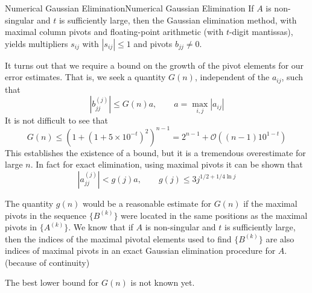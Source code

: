 \documentclass[../main.tex]{subfiles}
\begin{document}
\begin{lemma}{Numerical Gaussian Elimination}{Numerical Gaussian Elimination}
	If $A$ is non-singular and $t$ is sufficiently large, then the Gaussian elimination method, with maximal column pivots and floating-point arithmetic (with $t$-digit mantissas), yields multipliers $s_{ij}$ with $|s_{ij}| \leq 1$ and pivots $b_{jj} \neq 0$.
\end{lemma}

It turns out that we require a bound on the growth of the pivot elements for our error estimates. That is, we seek a quantity $G(n)$, independent of the $a_{ij}$, such that
\begin{equation} \label{eq:bound-for-pivots}
	| b_{jj}^{(j)} | \leq G(n) a, \qquad a = \max_{i,j} | a_{ij} |
\end{equation}
It is not difficult to see that
\begin{equation} \label{eq:bound-for-G}
	G(n) \leq (1 + (1 + 5 \times 10^{-t})^2)^{n-1} = 2^{n-1} + \mathcal{O}((n-1) 10^{1-t})
\end{equation}
This establishes the existence of a bound, but it is a tremendous overestimate for large $n$. In fact for exact elimination, using maximal pivots it can be shown that
\begin{equation}
	| a_{jj}^{(j)} | < g(j) a, \qquad g(j) \leq 3 j^{1/2 + 1/4 \ln j}
\end{equation}

The quantity $g(n)$ would be a reasonable estimate for $G(n)$ if the maximal pivots in the sequence $\{ B^{(k)} \}$ were located in the same positions as the maximal pivots in $\{ A^{(k)} \}$. We know that if $A$ is non-singular and $t$ is sufficiently large, then the indices of the maximal pivotal elements used to find $\{ B^{(k)} \}$ are also indices of maximal pivots in an exact Gaussian elimination procedure for $A$. (because of continuity)

The best lower bound for $G(n)$ is not known yet.
\end{document}

